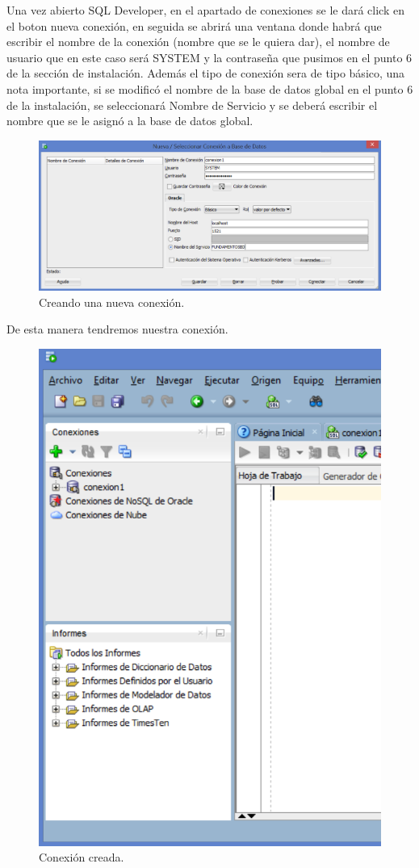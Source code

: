 \documentclass[10pt]{article}
\begin{document}
	Una vez abierto SQL Developer, en el apartado de conexiones se le dará click en el boton nueva conexión, en seguida se abrirá una ventana donde habrá que escribir el nombre de la conexión (nombre que se le quiera dar), el nombre de usuario que en este caso será SYSTEM y la contraseña que pusimos en el punto 6 de la sección de instalación. Además el tipo de conexión sera de tipo básico, una nota importante, si se modificó el nombre de la base de datos global en el punto 6 de la instalación, se seleccionará Nombre de Servicio y se deberá escribir el nombre que se le asignó a la base de datos global.\\
	\begin{figure}[H]
		\centering
	\includegraphics[width=0.6 \textwidth]{img/Imagenes_finales/im_c_2}
	\caption{Creando una nueva conexión.}
    \end{figure}
	
	De esta manera tendremos nuestra conexión.
	\begin{figure}[H]
		\centering
	\includegraphics[width=0.4 \textwidth]{img/Imagenes_finales/im_c_3}
	\caption{Conexión creada.}
    \end{figure}
	
\end{document}
